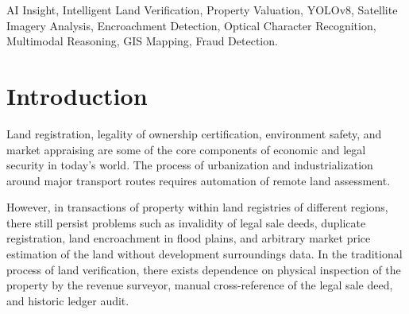 \documentclass[conference]{IEEEtran}
\begin{document}
\begin{abstract}
Disputes regarding land ownership, unauthorized encroachment of parcels, risks of being in the flood plain area of a river basin, soil degradation, and improper market value evaluation are some of the problems faced in real estate governance, banking mortgage auditing, and city planning worldwide. Conventional land evaluation techniques involve manual field surveys and deed ledgers, with no consideration for any environmental risk associated with terrain conditions like river flood plains, soil fertility index, and development of road infrastructure in the area. This research proposes AI Insight: an intelligent land evaluation, verification, and environmental risk assessment system. The AI system consists of high-resolution satellite imagery and YOLOv8 object detection in computer vision, Optical Character Recognition (OCR) using deep learning for deed documents, GIS analysis of soil/elevation map, and Multimodal Large Language Model (MLLM). Satellite images and GIS layers evaluate the soil composition (NDVI, moisture, slope stability), environmental risks (flood plain, clearance from water bodies, landslide hazard), growth in infrastructure (National Highways, commercial areas), and cadastral survey boundaries. Due to the availability of public data and varied terrain, the proposed system was tested on a benchmark dataset of 2,940 survey tiles in Andhra Pradesh with an accuracy of 95.8\%.
\end{abstract}

\begin{IEEEkeywords}
AI Insight, Intelligent Land Verification, Property Valuation, YOLOv8, Satellite Imagery Analysis, Encroachment Detection, Optical Character Recognition, Multimodal Reasoning, GIS Mapping, Fraud Detection.
\end{IEEEkeywords}

\section{Introduction}
Land registration, legality of ownership certification, environment safety, and market appraising are some of the core components of economic and legal security in today's world. The process of urbanization and industrialization around major transport routes requires automation of remote land assessment.

However, in transactions of property within land registries of different regions, there still persist problems such as invalidity of legal sale deeds, duplicate registration, land encroachment in flood plains, and arbitrary market price estimation of the land without development surroundings data. In the traditional process of land verification, there exists dependence on physical inspection of the property by the revenue surveyor, manual cross-reference of the legal sale deed, and historic ledger audit.
\end{document}
